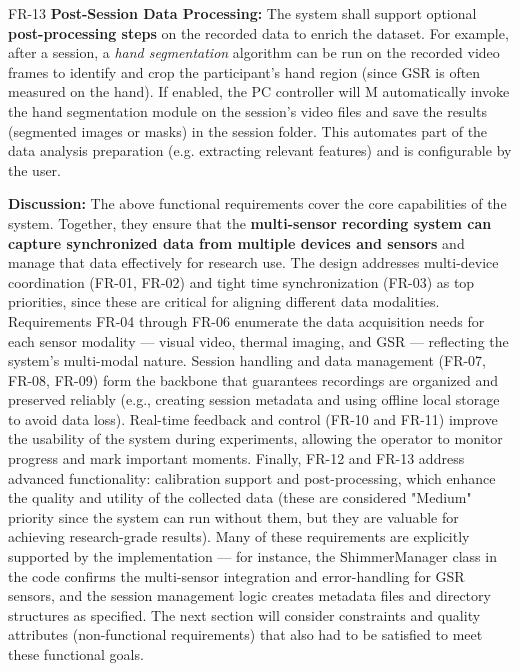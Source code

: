 \documentclass[11pt,a4paper]{report}
\begin{document}
  FR-13                   \textbf{Post-Session Data Processing:} The system shall support optional \textbf{post-processing steps} on the recorded data to enrich the dataset. For example, after a session, a \textit{hand segmentation} algorithm can be run on the recorded video frames to identify and crop the participant's hand region (since GSR is often measured on the hand). If enabled, the PC controller will   M
                          automatically invoke the hand segmentation module on the session's video files and save the results (segmented images or masks) in the session folder\cite{WHOStressDefinition}. This automates part of the data analysis preparation (e.g. extracting relevant 
                          features) and is configurable by the user.                                                                                                                                                                                                                                                                                                                                         

\textbf{Discussion:} The above functional requirements cover the core
capabilities of the system. Together, they ensure that the
\textbf{multi-sensor recording system can capture synchronized data from
multiple devices and sensors} and manage that data effectively for
research use. The design addresses multi-device coordination (FR-01,
FR-02) and tight time synchronization (FR-03) as top priorities, since
these are critical for aligning different data modalities. Requirements
FR-04 through FR-06 enumerate the data acquisition needs for each sensor
modality --- visual video, thermal imaging, and GSR --- reflecting the
system's multi-modal nature. Session handling and data management
(FR-07, FR-08, FR-09) form the backbone that guarantees recordings are
organized and preserved reliably (e.g., creating session metadata and
using offline local storage to avoid data loss). Real-time feedback and
control (FR-10 and FR-11) improve the usability of the system during
experiments, allowing the operator to monitor progress and mark
important moments. Finally, FR-12 and FR-13 address advanced
functionality: calibration support and post-processing, which enhance
the quality and utility of the collected data (these are considered
"Medium" priority since the system can run without them, but they are
valuable for achieving research-grade results). Many of these
requirements are explicitly supported by the implementation --- for
instance, the ShimmerManager class in the code confirms the
multi-sensor integration and error-handling for GSR
sensors\cite{AppleHealthWatch2019}\cite{Boucsein2012},
and the session management logic creates metadata files and directory
structures as
specified\cite{SamsungHealth2020}\cite{Fowles1981}.
The next section will consider constraints and quality attributes
(non-functional requirements) that also had to be satisfied to meet
these functional goals.
\end{document}
